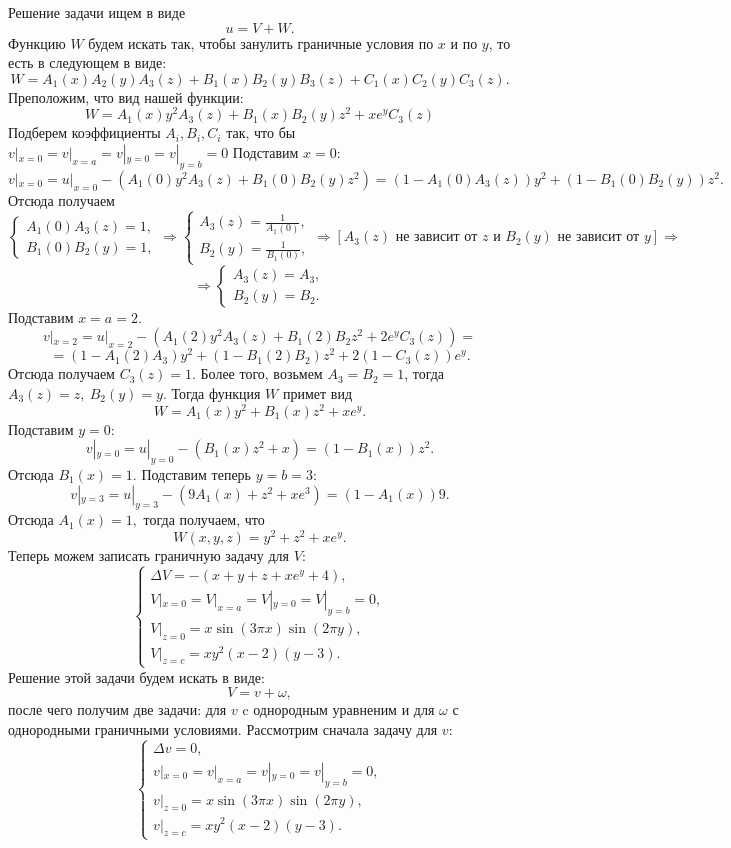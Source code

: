 \documentclass[11pt]{article}
\begin{document}
 Решение задачи ищем в виде $$u=V+W.$$
 Функцию $W$ будем искать так, чтобы занулить граничные условия по $x$ и по $y$, то есть в следующем в виде:
 $$W=A_1(x)A_2(y)A_3(z)+B_1(x)B_2(y)B_3(z)+C_1(x)C_2(y)C_3(z).$$
 Преположим, что вид нашей функции:
 $$W=A_1(x)y^2A_3(z)+B_1(x)B_2(y)z^2+xe^yC_3(z)$$
 Подберем коэффициенты $A_i, B_i, C_i$ так, что бы $v|_{x=0}=v|_{x=a}=v|_{y=0}=v|_{y=b}=0$
 Подставим $x=0$:
 $$v|_{x=0}=u|_{x=0}-(A_1(0)y^2A_3(z)+B_1(0)B_2(y)z^2)=(1-A_1(0)A_3(z))y^2+(1-B_1(0)B_2(y))z^2.$$
 Отсюда получаем 
 $$\begin{cases}
 A_1(0)A_3(z)=1,\\
 B_1(0)B_2(y)=1,
 \end{cases} \Rightarrow
 \begin{cases}
     A_3(z)=\frac{1}{A_1(0)},\\
     B_2(y)=\frac{1}{B_1(0)},
 \end{cases}\Rightarrow [\text{$A_3(z)$ не зависит от $z$ и $B_2(y)$ не зависит от $y$}]
 \Rightarrow $$
 $$\Rightarrow \begin{cases}
     A_3(z)=A_3,\\
     B_2(y)=B_2.
 \end{cases}$$
 Подставим $x=a=2.$
 $$v|_{x=2}=u|_{x=2}-(A_1(2)y^2A_3(z)+B_1(2)B_2 z^2+2e^yC_3(z))=$$
 $$=(1-A_1(2)A_3)y^2+(1-B_1(2)B_2)z^2+2(1-C_3(z))e^y.$$
 Отсюда получаем $C_3(z)=1$. Более того, возьмем $A_3=B_2=1$, тогда $A_3(z)=z, \ B_2(y)=y.$ Тогда функция $W$ примет вид
 $$W = A_1(x)y^2+B_1(x)z^2+xe^y.$$
 Подставим $y=0:$
 $$v|_{y=0}=u|_{y=0}-(B_1(x)z^2+x)=(1-B_1(x))z^2.$$
 Отсюда $B_1(x)=1.$ Подставим теперь $y=b=3:$
 $$v|_{y=3}=u|_{y=3}-(9A_1(x)+z^2+xe^3)=(1-A_1(x))9.$$
 Отсюда $A_1(x)=1,$ тогда получаем, что 
 $$W(x,y,z)=y^2+z^2+xe^y.$$
 Теперь можем записать граничную задачу для $V$: 
 $$\begin{cases}
     \Delta V=-(x+y+z+xe^y+4),\\
     V|_{x=0}=V|_{x=a}=V|_{y=0}=V|_{y=b}=0,\\
     V|_{z=0}=x\sin{(3\pi x)}\sin{(2\pi y)},\\
     V|_{z=c}=xy^2(x-2)(y-3).
 \end{cases}$$
 Решение этой задачи будем искать в виде:
 $$V=v+\omega,$$
 после чего получим две задачи: для $v$ c однородным уравненим и для $\omega$ с однородными граничными условиями.
Рассмотрим сначала задачу для $v$:
 $$\begin{cases}
    \Delta v=0,\\
    v|_{x=0}=v|_{x=a}=v|_{y=0}=v|_{y=b}=0,\\
     v|_{z=0}=x\sin{(3\pi x)}\sin{(2\pi y)},\\
     v|_{z=c}=xy^2(x-2)(y-3).
\end{cases}$$
\end{document}
